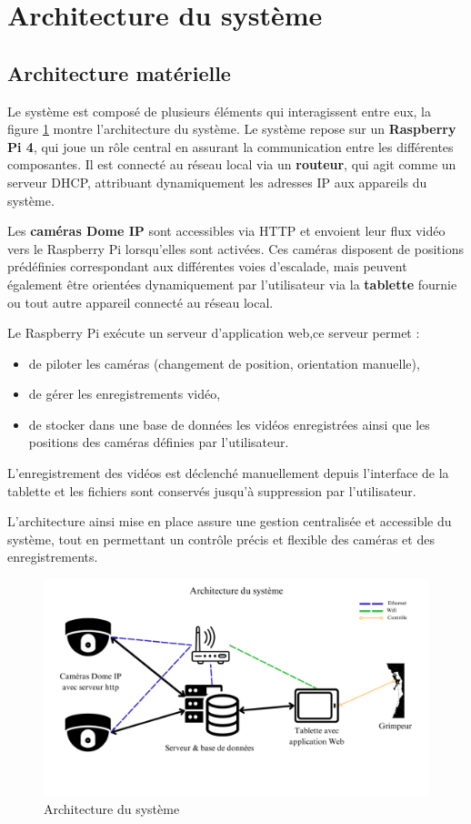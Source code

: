 \documentclass[a4paper, 11pt, french]{article}
\begin{document}
\section{Architecture du système}
\subsection{Architecture matérielle}
Le système est composé de plusieurs éléments qui interagissent entre eux, la figure \ref{fig:architecture} montre l'architecture du système. Le système repose sur un \textbf{Raspberry Pi 4}, qui joue un rôle central en assurant la communication entre les différentes composantes. Il est connecté au réseau local via un \textbf{routeur}, qui agit comme un serveur DHCP, attribuant dynamiquement les adresses IP aux appareils du système.

Les \textbf{caméras Dome IP} sont accessibles via HTTP et envoient leur flux vidéo vers le Raspberry Pi lorsqu’elles sont activées. Ces caméras disposent de positions prédéfinies correspondant aux différentes voies d’escalade, mais peuvent également être orientées dynamiquement par l’utilisateur via la \textbf{tablette} fournie ou tout autre appareil connecté au réseau local.

Le Raspberry Pi exécute un serveur d’application web,ce serveur permet :
\begin{itemize}
    \item de piloter les caméras (changement de position, orientation manuelle),
    \item de gérer les enregistrements vidéo,
    \item de stocker dans une base de données les vidéos enregistrées ainsi que les positions des caméras définies par l’utilisateur.
\end{itemize}

L’enregistrement des vidéos est déclenché manuellement depuis l’interface de la tablette et les fichiers sont conservés jusqu’à suppression par l’utilisateur.

L’architecture ainsi mise en place assure une gestion centralisée et accessible du système, tout en permettant un contrôle précis et flexible des caméras et des enregistrements.


\begin{figure}[!ht]
  \centering
  \includegraphics[width=\textwidth]{architectureMaterielle.png}
  \caption{Architecture du système}
  \label{fig:architecture}
\end{figure}
\end{document}
